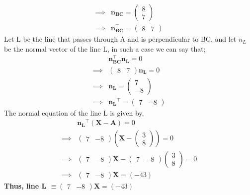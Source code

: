 \documentclass[journal,12pt,twocolumn]{IEEEtran}
\let\vec\mathbf
\providecommand{\brak}[1]{\ensuremath{\left(#1\right)}}
\newcommand{\myvec}[1]{\ensuremath{\begin{pmatrix}#1\end{pmatrix}}}
\begin{document}
\begin{enumerate}
\begin{align}
	\implies &\vec{n_{BC}} = \myvec{8 \\ 7}
	\\
	\implies &\vec{n_{BC}^{\top}} = \myvec{8 & 7}
    \end{align}
     Let L be the line that passes through A and is perpendicular to BC, and let $n_L$ be the normal vector of the line L, in such a case we can say that;
     \begin{align}
	&\vec{n_{BC}^{\top}} \vec{n_L} = 0
	\\
	\implies &\myvec{8 & 7}\vec{n_L} = 0
	\\
	\implies &\vec{n_L} = \myvec{7 \\ -8}
	\\
	\implies &\vec{n_L}^{\top} = \myvec{7 & -8}
    \end{align}
    The normal equation of the line L is given by, 
    \begin{align}
	&\vec{n_L}^{\top} \brak{\vec{X}-\vec{A}} = 0
	\\
	\implies &\myvec{7 & -8}\brak{\vec{X} - \myvec{3 \\ 8}}= 0
	\\
	\implies &\myvec{7 & -8}\vec{X}- \myvec{7 & -8}\myvec{3\\8}= 0
	\\
	\implies &\myvec{7 & -8}\vec{X} = \brak{-43}
    \end{align}
    \textbf{Thus, line L $\equiv \myvec{7 & -8}\vec{X} = \brak{-43}$}
\end{enumerate}
\end{document}
